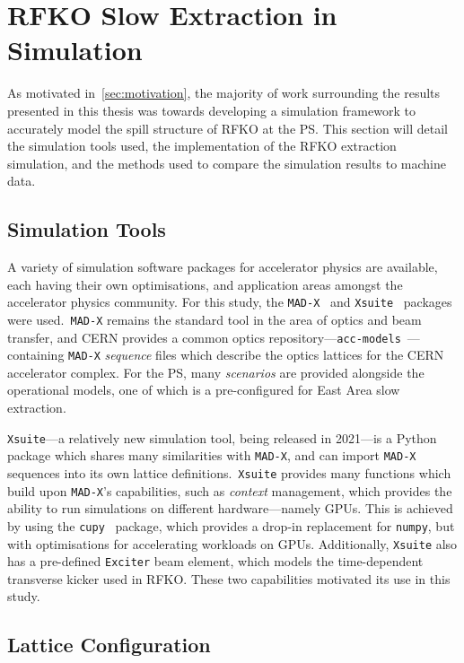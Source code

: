 \documentclass[11pt]{report}
\begin{document}
\section{RFKO Slow Extraction in Simulation}

As motivated in~\autoref{sec:motivation}, the majority of work surrounding the results presented in this thesis was towards developing a simulation framework to accurately model the spill structure of RFKO at the PS. This section will detail the simulation tools used, the implementation of the RFKO extraction simulation, and the methods used to compare the simulation results to machine data.

\subsection{Simulation Tools}

A variety of simulation software packages for accelerator physics are available, each having their own optimisations, and application areas amongst the accelerator physics community. For this study, the \verb|MAD-X|~\cite{Iselin:MAD} and \verb|Xsuite|~\cite{xsuite} packages were used.~\verb|MAD-X| remains the standard tool in the area of optics and beam transfer, and CERN provides a common optics repository---\verb|acc-models|~\cite{optics-repo}---containing \verb|MAD-X| \textit{sequence} files which describe the optics lattices for the CERN accelerator complex. For the PS, many \textit{scenarios} are provided alongside the operational models, one of which is a pre-configured for East Area slow extraction.

\verb|Xsuite|---a relatively new simulation tool, being released in 2021---is a Python package which shares many similarities with \verb|MAD-X|, and can import \verb|MAD-X| sequences into its own lattice definitions.~\verb|Xsuite| provides many functions which build upon \verb|MAD-X|'s capabilities, such as \textit{context} management, which provides the ability to run simulations on different hardware---namely GPUs. This is achieved by using the \verb|cupy|~\cite{CuPy} package, which provides a drop-in replacement for \verb|numpy|, but with optimisations for accelerating workloads on GPUs. Additionally, \verb|Xsuite| also has a pre-defined \verb|Exciter| beam element, which models the time-dependent transverse kicker used in RFKO. These two capabilities motivated its use in this study.

\subsection{Lattice Configuration} %
\end{document}

